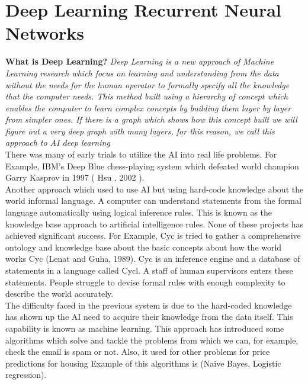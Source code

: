 
  \section{Deep Learning Recurrent Neural Networks}
\textbf{What is Deep Learning?} \textit{ Deep Learning is a new approach of Machine Learning research which focus on learning and understanding from the data without the needs for the human operator to formally specify all the knowledge that the computer needs. This method built using a hierarchy of concept which enables the computer to learn complex concepts by building them layer by layer from simpler ones. If there is a graph which shows how this concept built we will figure out a very deep graph with many layers, for this reason, we call this approach to AI deep learning \cite{Goodfellow-et-al-2016}
      }\\

      There was many of early trials to utilize the AI into real life problems. For Example, IBM's Deep Blue chess-playing system which defeated world champion Garry Kasprov in 1997 ( Hsu , 2002 ).%
      \\


      Another approach which used to use AI but using hard-code knowledge about the world informal language. A computer can understand statements from the formal language automatically using logical inference rules. This is known as the knowledge base approach to artificial intelligence rules. None of these projects has achieved significant success. For Example, Cyc is tried to gather a comprehensive ontology and knowledge base about the basic concepts about how the world works Cyc  (Lenat and Guha, 1989). Cyc is an inference engine and a database of statements in a language called Cycl. A staff of human supervisors enters these statements. People struggle to devise formal rules with enough complexity to describe the world accurately\cite{Goodfellow-et-al-2016}.\\

      The difficulty faced in the previous system is due to the hard-coded knowledge has shown up the AI need to acquire their knowledge from the data itself. This capability is known as machine learning. This approach has introduced some algorithms which solve and tackle the problems from which we can, for example, check the email is spam or not. Also, it used for other problems for price predictions for housing Example of this algorithms is (Naive Bayes, Logistic regression).

